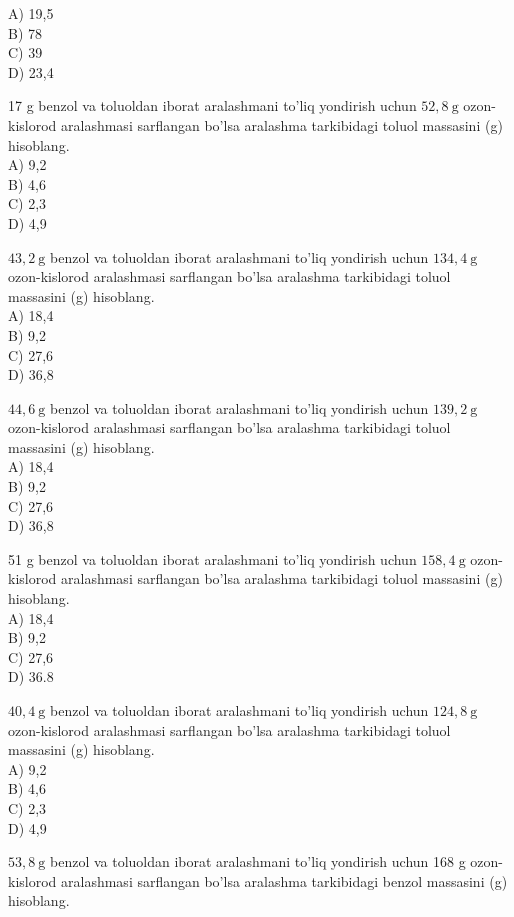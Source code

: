 A) 19,5\\
B) 78\\
C) 39\\
D) 23,4
  \item 17 g benzol va toluoldan iborat aralashmani to'liq yondirish uchun $52,8 \mathrm{~g}$ ozon-kislorod aralashmasi sarflangan bo'lsa aralashma tarkibidagi toluol massasini (g) hisoblang.\\
A) 9,2\\
B) 4,6\\
C) 2,3\\
D) 4,9
  \item $43,2 \mathrm{~g}$ benzol va toluoldan iborat aralashmani to'liq yondirish uchun $134,4 \mathrm{~g}$ ozon-kislorod aralashmasi sarflangan bo'lsa aralashma tarkibidagi toluol massasini (g) hisoblang.\\
A) 18,4\\
B) 9,2\\
C) 27,6\\
D) 36,8
  \item $44,6 \mathrm{~g}$ benzol va toluoldan iborat aralashmani to'liq yondirish uchun $139,2 \mathrm{~g}$ ozon-kislorod aralashmasi sarflangan bo'lsa aralashma tarkibidagi toluol massasini (g) hisoblang.\\
A) 18,4\\
B) 9,2\\
C) 27,6\\
D) 36,8
  \item 51 g benzol va toluoldan iborat aralashmani to'liq yondirish uchun $158,4 \mathrm{~g}$ ozon-kislorod aralashmasi sarflangan bo'lsa aralashma tarkibidagi toluol massasini (g) hisoblang.\\
A) 18,4\\
B) 9,2\\
C) 27,6\\
D) 36.8
  \item $40,4 \mathrm{~g}$ benzol va toluoldan iborat aralashmani to'liq yondirish uchun $124,8 \mathrm{~g}$ ozon-kislorod aralashmasi sarflangan bo'lsa aralashma tarkibidagi toluol massasini (g) hisoblang.\\
A) 9,2\\
B) 4,6\\
C) 2,3\\
D) 4,9
  \item $53,8 \mathrm{~g}$ benzol va toluoldan iborat aralashmani to'liq yondirish uchun 168 g ozon-kislorod aralashmasi sarflangan bo'lsa aralashma tarkibidagi benzol massasini (g) hisoblang.\\

